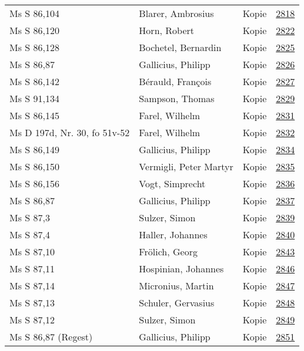 \documentclass[10pt,a4paper,landscape]{report}
\begin{document}
\begin{longtable}{p{16cm}p{4cm}lr}
Ms S 86,104	&	Blarer, Ambrosius	&	Kopie	&	\href{http://130.60.24.72/assignment/2818}{2818}\\
Ms S 86,120	&	Horn, Robert	&	Kopie	&	\href{http://130.60.24.72/assignment/2822}{2822}\\
Ms S 86,128	&	Bochetel, Bernardin	&	Kopie	&	\href{http://130.60.24.72/assignment/2825}{2825}\\
Ms S 86,87	&	Gallicius, Philipp	&	Kopie	&	\href{http://130.60.24.72/assignment/2826}{2826}\\
Ms S 86,142	&	Bérauld, François	&	Kopie	&	\href{http://130.60.24.72/assignment/2827}{2827}\\
Ms S 91,134	&	Sampson, Thomas	&	Kopie	&	\href{http://130.60.24.72/assignment/2829}{2829}\\
Ms S 86,145	&	Farel, Wilhelm	&	Kopie	&	\href{http://130.60.24.72/assignment/2831}{2831}\\
Ms D 197d, Nr. 30, fo 51v-52	&	Farel, Wilhelm	&	Kopie	&	\href{http://130.60.24.72/assignment/2832}{2832}\\
Ms S 86,149	&	Gallicius, Philipp	&	Kopie	&	\href{http://130.60.24.72/assignment/2834}{2834}\\
Ms S 86,150	&	Vermigli, Peter Martyr	&	Kopie	&	\href{http://130.60.24.72/assignment/2835}{2835}\\
Ms S 86,156	&	Vogt, Simprecht	&	Kopie	&	\href{http://130.60.24.72/assignment/2836}{2836}\\
Ms S 86,87	&	Gallicius, Philipp	&	Kopie	&	\href{http://130.60.24.72/assignment/2837}{2837}\\
Ms S 87,3	&	Sulzer, Simon	&	Kopie	&	\href{http://130.60.24.72/assignment/2839}{2839}\\
Ms S 87,4	&	Haller, Johannes	&	Kopie	&	\href{http://130.60.24.72/assignment/2840}{2840}\\
Ms S 87,10	&	Frölich, Georg	&	Kopie	&	\href{http://130.60.24.72/assignment/2843}{2843}\\
Ms S 87,11	&	Hospinian, Johannes	&	Kopie	&	\href{http://130.60.24.72/assignment/2846}{2846}\\
Ms S 87,14	&	Micronius, Martin	&	Kopie	&	\href{http://130.60.24.72/assignment/2847}{2847}\\
Ms S 87,13	&	Schuler, Gervasius	&	Kopie	&	\href{http://130.60.24.72/assignment/2848}{2848}\\
Ms S 87,12	&	Sulzer, Simon	&	Kopie	&	\href{http://130.60.24.72/assignment/2849}{2849}\\
Ms S 86,87 (Regest)	&	Gallicius, Philipp	&	Kopie	&	\href{http://130.60.24.72/assignment/2851}{2851}\\

\end{longtable}
\end{document}
